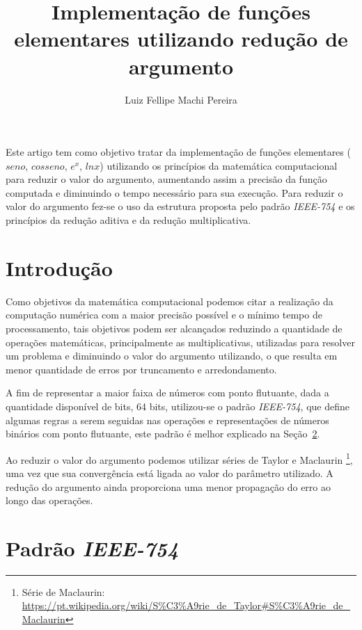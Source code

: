 \documentclass[12pt]{article}
\title{Implementação de funções elementares utilizando redução de argumento}
\author{Luiz Fellipe Machi Pereira\inst{1}}
\begin{document}
 

\maketitle

\begin{resumo}

Este artigo tem como objetivo tratar da implementação de funções elementares ($seno$, $cosseno$, $e^x$, $ln x$) utilizando os princípios da matemática computacional para reduzir o valor do argumento, aumentando assim a precisão da função computada e diminuindo o tempo necessário para sua execução. Para reduzir o valor do argumento fez-se o uso da estrutura proposta pelo padrão \textit{IEEE-754} e os princípios da redução aditiva e da redução multiplicativa.
\end{resumo}

\section{Introdução}

Como objetivos da matemática computacional podemos citar a realização da computação numérica com a maior precisão possível e o mínimo tempo de processamento, tais objetivos podem ser alcançados reduzindo a quantidade de operações matemáticas, principalmente as multiplicativas, utilizadas para resolver um problema e diminuindo o valor do argumento utilizando, o que resulta em menor quantidade de erros por truncamento e arredondamento.

A fim de representar a maior faixa de números com ponto flutuante, dada a quantidade disponível de bits, 64 bits, utilizou-se o padrão \textit{IEEE-754}, que define algumas regras a serem seguidas nas operações e representações de números binários com ponto flutuante, este padrão é melhor explicado na Seção~\ref{sec:ieee754}.

Ao reduzir o valor do argumento podemos utilizar séries de Taylor e Maclaurin \footnote{Série de Maclaurin: \url{https://pt.wikipedia.org/wiki/S\%C3\%A9rie_de_Taylor#S\%C3\%A9rie_de_Maclaurin}}, uma vez que sua convergência está ligada ao valor do parâmetro utilizado. A redução do argumento ainda proporciona uma menor propagação do erro ao longo das operações.

\section{Padrão \textit{IEEE-754}}\label{sec:ieee754}
\end{document}

